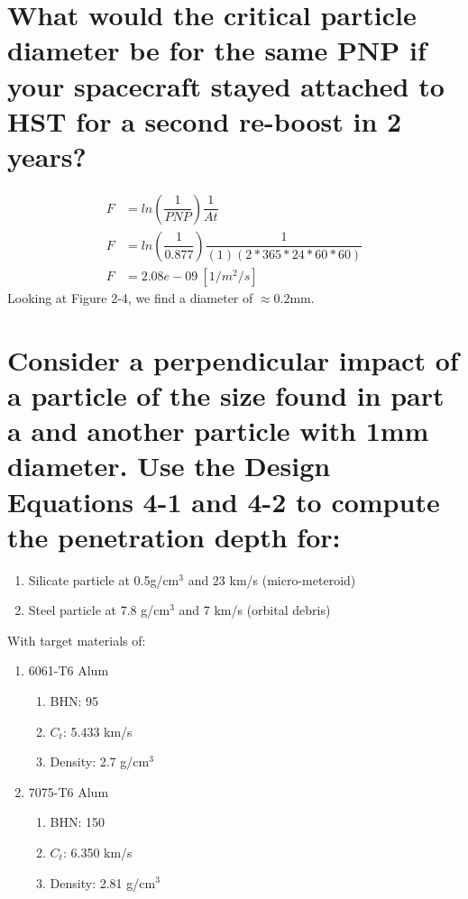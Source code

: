 \documentclass[onecolumn,10pt]{jhwhw}
\begin{document}
\part{What would the critical particle diameter be for the same PNP if your spacecraft stayed attached to HST for a second re-boost in 2 years?}
\begin{align*}
F &= ln(\dfrac{1}{PNP}) \dfrac{1}{At}\\
F &= ln(\dfrac{1}{0.877}) \dfrac{1}{(1)(2*365*24*60*60)}\\
F &= 2.08e-09~[1/m^2/s]
\end{align*}
\noindent Looking at Figure 2-4, we find a diameter of $\approx 0.2$mm.

\part{Consider a perpendicular impact of a particle of the size found in part a and another particle with 1mm diameter. Use the Design Equations 4-1 and 4-2 to compute the penetration depth for:}
\begin{enumerate}
\item Silicate particle at 0.5g/cm$^3$ and 23 km/s (micro-meteroid)
\item Steel particle at 7.8 g/cm$^3$ and 7 km/s (orbital debris)
\end{enumerate}
With target materials of:
\begin{enumerate}
\item 6061-T6 Alum
\begin{enumerate}
\item BHN: 95
\item $C_t$: 5.433 km/s
\item Density: 2.7 g/cm$^3$
\end{enumerate}
\item 7075-T6 Alum
\begin{enumerate}
\item BHN: 150
\item $C_t$: 6.350 km/s
\item Density: 2.81 g/cm$^3$
\end{enumerate}
\end{enumerate}
\end{document}
